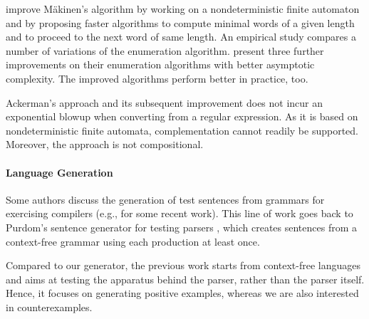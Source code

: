 \citet{DBLP:journals/tcs/AckermanS09} improve M{\"{a}}kinen's
algorithm by working on a nondeterministic finite automaton
and by proposing faster algorithms to compute minimal words of a given
length and to proceed to the next word of same length. An empirical
study compares a number of variations of the enumeration algorithm.
%
%
\citet{DBLP:conf/cocoon/AckermanM09} present three further
improvements on their enumeration algorithms with better asymptotic
complexity. The improved algorithms perform better in practice, too.

Ackerman's approach and its subsequent improvement does not incur an
exponential blowup when converting from a regular expression. As it is based on
nondeterministic finite automata, complementation cannot readily be
supported. Moreover, the approach is not compositional.





\paragraph{Language Generation}
Some authors discuss the generation of test sentences from grammars for
exercising compilers
(e.g., \cite{DBLP:conf/cisse/ParachaF08,DBLP:conf/compsac/ZhengW09}
for some recent work). This
line of work goes back to Purdom's sentence generator for testing
parsers \cite{purdom72:_senten_gener_testin_parser}, which creates
sentences from a context-free grammar using each production at least
once.

Compared to our generator, the previous work starts from context-free
languages and aims at testing the apparatus behind the parser,
rather than the parser itself. Hence, it focuses on generating
positive examples, whereas we are also interested in counterexamples.

